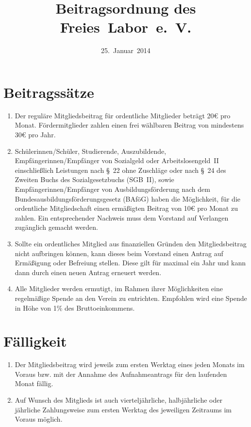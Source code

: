 \documentclass[a4paper,12pt]{scrartcl}
\title{Beitragsordnung des Freies~Labor~e.~V.}
\date{25.~Januar~2014}
\begin{document}
\maketitle

\section{Beitragssätze}
\begin{enumerate}
  \item Der reguläre Mitgliedsbeitrag für ordentliche Mitglieder beträgt 20€
    pro Monat. Fördermitglieder zahlen einen frei wählbaren Beitrag von
    mindestens 30€ pro Jahr.
  \item Schülerinnen/Schüler, Studierende, Auszubildende, 
    Empfängerinnen/Empfänger von Sozialgeld oder Arbeitslosengeld~II 
    einschließlich Leistungen nach §~22 ohne Zuschläge oder nach §~24 des 
    Zweiten Buchs des Sozialgesetzbuchs (SGB~II), sowie Empfängerinnen/Empfänger
    von Ausbildungsförderung nach dem Bundesausbildungsförderungsgesetz (BAföG)
    haben die Möglichkeit, für die ordentliche Mitgliedschaft einen ermäßigten
    Beitrag von 10€ pro Monat zu zahlen. Ein entsprechender Nachweis muss dem
    Vorstand auf Verlangen zugänglich gemacht werden.
  \item Sollte ein ordentliches Mitglied aus finanziellen Gründen den
    Mitgliedsbeitrag nicht aufbringen können, kann dieses beim Vorstand einen
    Antrag auf Ermäßigung oder Befreiung stellen. Diese gilt für maximal ein
    Jahr und kann dann durch einen neuen Antrag erneuert werden.
  \item Alle Mitglieder werden ermutigt, im Rahmen ihrer Möglichkeiten eine
    regelmäßige Spende an den Verein zu entrichten. Empfohlen wird eine Spende
    in Höhe von 1\% des Bruttoeinkommens.
\end{enumerate}

\section{Fälligkeit}
\begin{enumerate}
  \item Der Mitgliedsbeitrag wird jeweils zum ersten Werktag eines jeden Monats
    im Voraus bzw. mit der Annahme des Aufnahmeantrags für den laufenden Monat
    fällig.
  \item Auf Wunsch des Mitglieds ist auch vierteljährliche, halbjährliche oder
    jährliche Zahlungsweise zum ersten Werktag des jeweiligen Zeitraums im
    Voraus möglich.
\end{enumerate}
\end{document}
